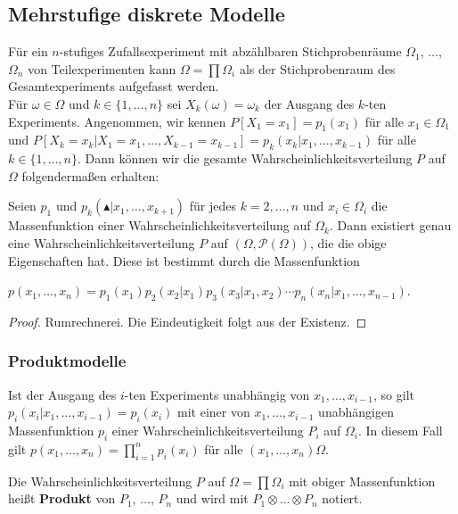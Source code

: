 \subsection{Mehrstufige diskrete Modelle}
F\"ur ein $n$-stufiges Zufallsexperiment mit abz\"ahlbaren Stichprobenr\"aume
$\Omega_1$, $\ldots$,  $\Omega_n$ von Teilexperimenten kann $\Omega = \prod
\Omega_i$ als der Stichprobenraum des Gesamtexperiments aufgefasst werden. \\

F\"ur $\omega \in \Omega$ und $k \in \{1, \ldots, n \}$ sei $X_k(\omega) =
\omega_k$ der Ausgang des $k$-ten Experiments. Angenommen, wir kennen $P[X_1 = 
x_1] = p_1(x_1)$ f\"ur alle $x_1 \in \Omega_1$ und $P[X_k=x_k|X_1=x_1, \ldots,
X_{k-1}=x_{k-1}] = p_k(x_k|x_1, \ldots, x_{k-1})$ f\"ur alle $k \in \{ 1,
\ldots, n \}$. Dann k\"onnen wir die gesamte Wahrscheinlichkeitsverteilung
$P$ auf $\Omega$ folgenderma\ss en erhalten:

\begin{satz} Seien $p_1$ und $p_k(\blacktriangle|x_1, \ldots, x_{k+1})$ f\"ur
jedes $k=2, \ldots, n$ und $x_i \in \Omega_i$ die Massenfunktion einer
Wahrscheinlichkeitsverteilung auf $\Omega_k$. Dann existiert genau eine
Wahrscheinlichkeitsverteilung $P$ auf $(\Omega, \mathcal{P}(\Omega ))$, die die
obige Eigenschaften hat. Diese ist bestimmt durch die Massenfunktion
\begin{center}
$p(x_1, \ldots, x_n) = p_1(x_1) p_2(x_2 | x_1) p_3(x_3 | x_1, x_2) \cdots p_n(
x_n | x_1, \ldots, x_{n-1})$.
\end{center}
\end{satz}
\begin{proof} Rumrechnerei. Die Eindeutigkeit folgt aus der Existenz.
\end{proof}

\subsubsection{Produktmodelle}
Ist der Ausgang des $i$-ten Experiments unabh\"angig von $x_1,\ldots ,x_{i-1}$,
so gilt $p_i(x_i|x_1, \ldots, x_{i-1}) = p_i(x_i)$ mit einer von $x_1,\ldots ,
x_{i-1}$ unabh\"angigen Massenfunktion $p_i$ einer
Wahrscheinlichkeitsverteilung $P_i$ auf $\Omega_i$. In diesem Fall gilt
$p(x_1, \ldots, x_n) = \prod_{i=1}^n p_i(x_i)$ f\"ur alle $(x_1, \ldots, x_n)
\Omega$.

\begin{definition} Die Wahrscheinlichkeitsverteilung $P$ auf $\Omega = \prod
\Omega_i$ mit obiger Massenfunktion hei\ss t \textbf{Produkt} von $P_1$,
$\ldots$, $P_n$ und wird mit $P_1 \otimes \ldots \otimes P_n$ notiert.
\end{definition}

